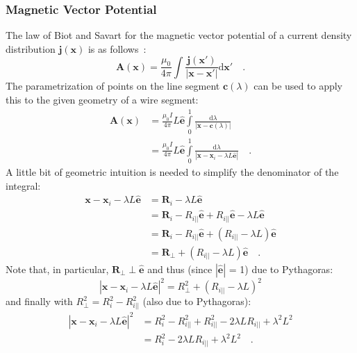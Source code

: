 \subsubsection{Magnetic Vector Potential}
The law of Biot and Savart for the magnetic vector potential of a current density distribution $\mathbf{j}(\mathbf{x})$ is as follows~\cite{jackson}:
\begin{equation}
 \mathbf{A}(\mathbf{x}) = \frac{\mu_0}{4 \pi} \int \frac{\mathbf{j}(\mathbf{x}')}{|\mathbf{x} - \mathbf{x}'|} \mathrm{d}\mathbf{x}' \quad .
\end{equation}
The parametrization of points on the line segment $\mathbf{c}(\lambda)$ can be used to apply this to the given geometry of a wire segment:
\begin{align}
 \mathbf{A}(\mathbf{x}) & = \frac{\mu_0 I}{4 \pi} L \hat{\mathbf{e}} \int\limits_0^1 \frac{\mathrm{d}\lambda}{|\mathbf{x} - \mathbf{c}(\lambda)|} \\
        ~               & = \frac{\mu_0 I}{4 \pi} L \hat{\mathbf{e}} \int\limits_0^1 \frac{\mathrm{d}\lambda}{|\mathbf{x} - \mathbf{x}_i - \lambda L \hat{\mathbf{e}}|} \quad .
\end{align}
A little bit of geometric intuition is needed to simplify the denominator of the integral:
\begin{align}
 \mathbf{x} - \mathbf{x}_i - \lambda L \hat{\mathbf{e}}
   & = \mathbf{R}_i - \lambda L \hat{\mathbf{e}} \\
 ~ & = \mathbf{R}_i - R_{i ||} \hat{\mathbf{e}} + R_{i ||} \hat{\mathbf{e}} - \lambda L \hat{\mathbf{e}} \\
 ~ & = \mathbf{R}_i - R_{i ||} \hat{\mathbf{e}} + \left( R_{i ||} - \lambda L \right) \hat{\mathbf{e}} \\
 ~ & = \mathbf{R}_\perp + \left( R_{i ||} - \lambda L \right) \hat{\mathbf{e}} \quad .
\end{align}
Note that, in particular, $\mathbf{R}_\perp \perp \hat{\mathbf{e}}$ and thus (since $|\hat{\mathbf{e}}|$ = 1) due to Pythagoras:
\begin{equation}
 | \mathbf{x} - \mathbf{x}_i - \lambda L \hat{\mathbf{e}} |^2 = R_\perp^2 + \left( R_{i ||} - \lambda L \right)^2
\end{equation}
and finally with $R_\perp^2 = R_i^2 - R_{i ||}^2$ (also due to Pythagoras):
\begin{align}
 | \mathbf{x} - \mathbf{x}_i - \lambda L \hat{\mathbf{e}} |^2
   & = R_i^2 - R_{i ||}^2 + R_{i ||}^2 - 2 \lambda L R_{i ||} + \lambda^2 L^2 \\
 ~ & = R_i^2 - 2 \lambda L R_{i ||} + \lambda^2 L^2 \quad .
\end{align}
